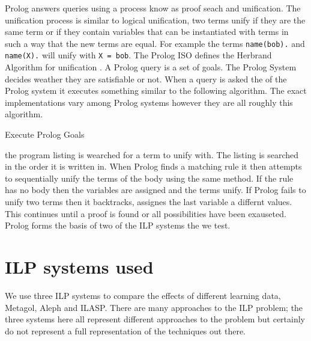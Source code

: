Prolog answers queries using a process know as proof seach and unification. The unification process is similar to logical unification, two terms unify if they are the same term or if they contain variables that can be instantiated with terms in such a way that the new terms are equal. For example the terms \texttt{name(bob).} and \texttt{name(X).} will unify with \texttt{X = bob}. The Prolog ISO defines the Herbrand Algorithm for unification \cite{PrologISO}. A Prolog query is a set of goals. The Prolog System decides weather they are satisfiable or not. When a query is asked the of the Prolog system it executes something similar to the following algorithm. The exact implementations vary among Prolog systems however they are all roughly this algorithm.
\begin{algorithm}
	\caption{Execute Prolog Goals}
\end{algorithm}

the program listing is wearched for a term to unify with. The listing is searched in the order it is written in. When Prolog finds a matching rule it then attempts to sequentially unify the terms of the body using the same method. If the rule has no body then the variables are assigned and the terms unify. If Prolog fails to unify two terms then it backtracks, assignes the last variable a differnt values. This continues until a proof is found or all possibilities have been exauseted\cite{Bratko}. Prolog forms the basis of two of the ILP systems the we test.

\section{ILP systems used}
We use three ILP systems to compare the effects of different learning data, Metagol, Aleph and ILASP. There are many approaches to the ILP problem\cite{Svetla/ILPOverview}\cite{Cropper/NewIdeas}; the three systems here all represent different approaches to the problem but certainly do not represent a full representation of the techniques out there.
